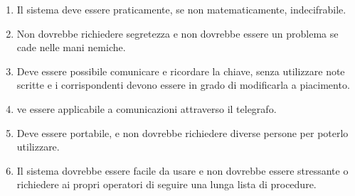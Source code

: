 \begin{enumerate}
	\item \textsf{\small Il sistema deve essere praticamente, se non matematicamente, indecifrabile.} %
	\item \textsf{\small Non dovrebbe richiedere segretezza e non dovrebbe essere un problema se cade nelle mani nemiche.} %
	\item \textsf{\small Deve essere possibile comunicare e ricordare la chiave, senza utilizzare note scritte e i corrispondenti devono essere in grado di modificarla a piacimento.} %
	\item \textsf{\small ve essere applicabile a comunicazioni attraverso il telegrafo.} %
	\item \textsf{\small  Deve essere portabile, e non dovrebbe richiedere diverse persone per poterlo utilizzare.} %
	\item \textsf{\small Il sistema dovrebbe essere facile da usare e non dovrebbe essere stressante o richiedere ai propri operatori di seguire una lunga lista di procedure.} %
\end{enumerate}

